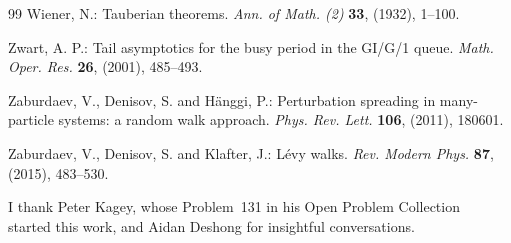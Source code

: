 \documentclass[EJP,preprint]{ejpecp}
\theoremstyle{ejpecpbodyit}
\begin{document}
\begin{thebibliography}{99}
 Wiener, N.: Tauberian theorems. \emph{Ann. of Math. (2)}
  \textbf{33}, (1932), 1--100.

 Zwart, A. P.: Tail asymptotics for the busy period in the GI/G/1 queue.
  \emph{Math. Oper. Res.} \textbf{26}, (2001), 485--493. 

 Zaburdaev, V., Denisov, S. and H\"anggi, P.: Perturbation
  spreading in many-particle systems: a random walk approach. \emph{Phys. Rev.
  Lett.} \textbf{106}, (2011), 180601.

 Zaburdaev, V., Denisov, S. and Klafter, J.: L\'evy walks.
  \emph{Rev. Modern Phys.} \textbf{87}, (2015), 483--530. 

\end{thebibliography}

\begin{acks}[Acknowledgments]
I thank Peter Kagey, whose Problem~131 in his Open Problem
Collection~\cite{kagey131} started this work, and Aidan Deshong for
insightful conversations.
\end{acks}
\end{document}
